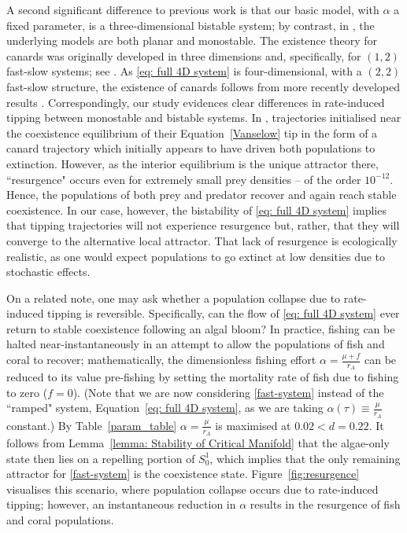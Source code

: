\documentclass{article}
\theoremstyle{definition}
\numberwithin{equation}{section}
\begin{document}
A second significant difference to previous work is that our basic model, with $\alpha$ a fixed parameter, is a three-dimensional bistable system; by contrast, in \cite{Plankton-tipping,vanselow_2019_when}, the underlying models are both planar and monostable. The existence theory for canards was originally developed in three dimensions and, specifically, for $(1,2)$ fast-slow systems; see \cite[Theorem $4.1$]{SZMOLYAN2001419}.
As \eqref{eq: full 4D system} is four-dimensional, with a $(2,2)$ fast-slow structure, the existence of canards follows from more recently developed results \cite[Theorem $4.2$]{Canards}. Correspondingly, our study evidences clear differences in rate-induced tipping between monostable and bistable systems. In \cite{vanselow_2019_when}, trajectories initialised near the coexistence equilibrium of their Equation~\eqref{Vanselow} tip in the form of a canard trajectory which initially appears to have driven both populations to extinction. However, as the interior equilibrium is the unique attractor there, ``resurgence" occurs even for extremely small prey densities -- of the order $10^{-12}$. Hence, the populations of both prey and predator recover and again reach stable coexistence. 
In our case, however, the bistability of \eqref{eq: full 4D system} implies that tipping trajectories will not experience resurgence but, rather, that they will converge to the alternative local attractor. That lack of resurgence is ecologically realistic, as one would expect populations to go extinct at low densities due to stochastic effects.

On a related note, one may ask whether a population collapse due to rate-induced tipping is reversible. Specifically, can the flow of \eqref{eq: full 4D system} ever return to stable coexistence following an algal bloom? In practice, fishing can be halted near-instantaneously in an attempt to allow the populations of fish and coral to recover; mathematically, the dimensionless fishing effort $\alpha=\frac{\mu+f}{r_A}$ can be reduced to its value pre-fishing by setting the mortality rate of fish due to fishing to zero ($f=0$). (Note that we are now considering \eqref{fast-system} instead of the ``ramped" system, Equation~\eqref{eq: full 4D system}, as we are taking $\alpha(\tau)\equiv\frac{\mu}{r_A}$ constant.)
By Table~\ref{param_table} $\alpha=\frac{\mu}{r_A}$ is maximised at $0.02<d=0.22$. It follows from Lemma~\ref{lemma: Stability of Critical Manifold} that the algae-only state then lies on a repelling portion of $S_0^1$, which implies that the only remaining attractor for \eqref{fast-system} is the coexistence state. Figure~\ref{fig:resurgence} visualises this scenario, where population collapse occurs due to rate-induced tipping; however, an instantaneous reduction in $\alpha$ results in the resurgence of fish and coral populations.  
\end{document}
